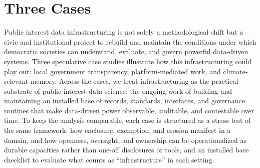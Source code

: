 \documentclass[acmsmall,screen]{acmart}
\begin{document}

\section*{Three Cases}

Public interest data infrastructuring is not solely a methodological shift but a civic and institutional project to rebuild and maintain the conditions under which democratic societies can understand, evaluate, and govern powerful data-driven systems. Three speculative case studies illustrate how this infrastructuring could play out: local government transparency, platform-mediated work, and climate-relevant memory. Across the cases, we treat infrastructuring as the practical substrate of public interest data science: the ongoing work of building and maintaining an installed base of records, standards, interfaces, and governance routines that make data-driven power observable, auditable, and contestable over time. To keep the analysis comparable, each case is structured as a stress test of the same framework: how enclosure, exemption, and erosion manifest in a domain, and how openness, oversight, and ownership can be operationalized as durable capacities rather than one-off disclosures or tools, and an installed base checklist to evaluate what counts as ``infrastructure'' in each setting.
\end{document}
